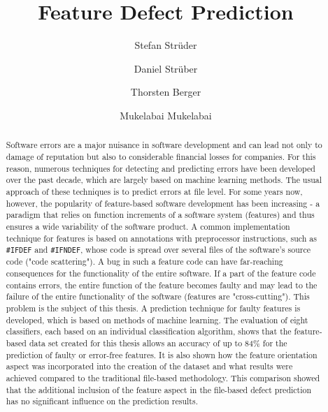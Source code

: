 \documentclass[sigconf]{acmart}
\begin{document}
\title{Feature Defect Prediction}
\renewcommand{\shorttitle}{}

\author{Stefan Strüder}

\author{Daniel Strüber}

\author{Thorsten Berger}

\author{Mukelabai Mukelabai}

\renewcommand{\shortauthors}{}


\begin{abstract}
Software errors are a major nuisance in software development and can lead not only to damage of reputation but also to considerable financial losses for companies. For this reason, numerous techniques for detecting and predicting errors have been developed over the past decade, which are largely based on machine learning methods. The usual approach of these techniques is to predict errors at file level. For some years now, however, the popularity of feature-based software development has been increasing - a paradigm that relies on function increments of a software system (features) and thus ensures a wide variability of the software product. A common implementation technique for features is based on annotations with preprocessor instructions, such as \texttt{\#IFDEF} and \texttt{\#IFNDEF}, whose code is spread over several files of the software's source code ("code scattering"). A bug in such a feature code can have far-reaching consequences for the functionality of the entire software. If a part of the feature code contains errors, the entire function of the feature becomes faulty and may lead to the failure of the entire functionality of the software (features are "cross-cutting"). This problem is the subject of this thesis. A prediction technique for faulty features is developed, which is based on methods of machine learning. The evaluation of eight classifiers, each based on an individual classification algorithm, shows that the feature-based data set created for this thesis allows an accuracy of up to 84\% for the prediction of faulty or error-free features. It is also shown how the feature orientation aspect was incorporated into the creation of the dataset and what results were achieved compared to the traditional file-based methodology. This comparison showed that the additional inclusion of the feature aspect in the file-based defect prediction has no significant influence on the prediction results.

\end{abstract}
\end{document}
